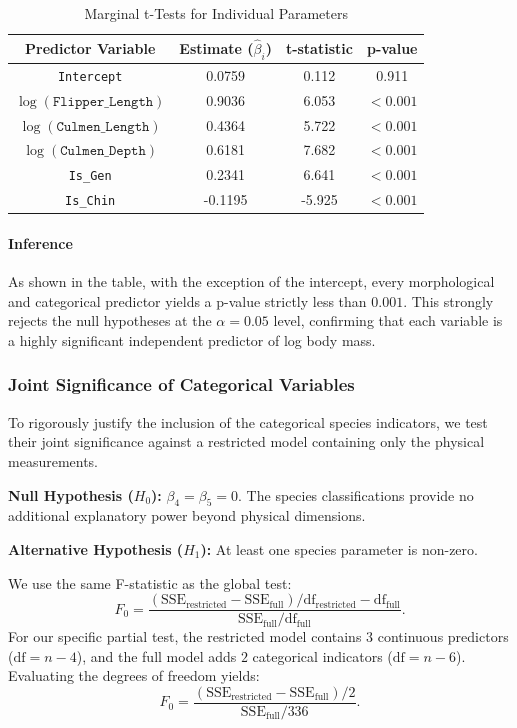 \documentclass[12pt]{article}
\begin{document}
  \begin{table}[H]
    \centering
    \begin{tabular}{|| c | c | c | c ||}
      \hline
      \textbf{Predictor Variable}
      & \textbf{Estimate ($\hat{\beta}_i$)}
      & \textbf{t-statistic}
      & \textbf{p-value} \\
      \hline\hline
      \texttt{Intercept} & 0.0759 & 0.112 & 0.911 \\
      $\log(\texttt{Flipper\_Length})$ & 0.9036 & 6.053 & $<0.001$ \\
      $\log(\texttt{Culmen\_Length})$ & 0.4364 & 5.722 & $<0.001$ \\
      $\log(\texttt{Culmen\_Depth})$ & 0.6181 & 7.682 & $<0.001$ \\
      \texttt{Is\_Gen} & 0.2341 & 6.641 & $<0.001$ \\
      \texttt{Is\_Chin} & -0.1195 & -5.925 & $<0.001$ \\
      \hline
    \end{tabular}
    \caption{Marginal t-Tests for Individual Parameters}
  \end{table}

  \paragraph{Inference}
  As shown in the table, with the exception of the intercept,
  every morphological and categorical predictor yields a
  p-value strictly less than $0.001$. This strongly rejects
  the null hypotheses at the $\alpha = 0.05$ level, confirming
  that each variable is a highly significant independent
  predictor of log body mass.


  \subsubsection{Joint Significance of Categorical Variables}
  To rigorously justify the inclusion of the categorical
  species indicators, we test their joint significance against
  a restricted model containing only the physical measurements.
  \begin{itemize}
      \ii \textbf{Null Hypothesis ($H_0$):} $\beta_4 = \beta_5 = 0$.
      The species classifications provide no additional
      explanatory power beyond physical dimensions.

      \ii \textbf{Alternative Hypothesis ($H_1$):} At least one
      species parameter is non-zero.
  \end{itemize}
  We use the same F-statistic as the global test:
  \[
    F_0 = \frac{{(\text{SSE}_{\text{restricted}} -
    \text{SSE}_{\text{full}})} / {\mathrm{df}_{\text{restricted}} -
    \mathrm{df}_{\text{full}}}}{\text{SSE}_{\text{full}}
    / \mathrm{df}_{\text{full}}}
    .\]
  For our specific partial test, the restricted model contains
  $3$ continuous predictors ($\mathrm{df} = n-4$), and the full model
  adds $2$ categorical indicators ($\mathrm{df} = n-6$). Evaluating
  the degrees of freedom yields:
  \[
    F_0 = \frac{(\text{SSE}_{\text{restricted}} -
    \text{SSE}_{\text{full}}) / 2}{\text{SSE}_{\text{full}}
    / 336}
    .\]
\end{document}
